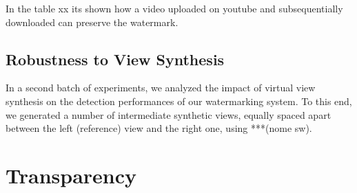  \begin{table}[htbp]
  \label{Tab:compkz}
  \begin{center}
  \caption{}
  \end{center}
  \end{table}
 
In the table xx its shown how a video uploaded on youtube and subsequentially downloaded can preserve the watermark.

\begin{table}[htbp]
 \label{Tab:ytgt}
 \begin{center}
 \caption{}
 \end{center}
 \end{table}
\begin{table}[htbp]
 \label{Tab:ytkz}
 \begin{center}
 \caption{}
 \end{center}
 \end{table}
 
\subsection{Robustness to View Synthesis}

In a second batch of experiments, we analyzed the impact of virtual view synthesis on the detection performances
of our watermarking system. To this end, we generated a number of intermediate synthetic views, equally spaced
apart between the left (reference) view and the right one, using ***(nome sw).\newline



\section{Transparency}